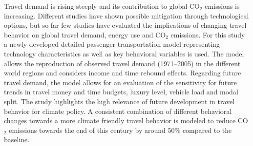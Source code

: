 Travel demand is rising steeply and its contribution to global CO$_2$ emissions is increasing. Different studies have shown possible mitigation through technological options, but so far few studies have evaluated the implications of changing travel behavior on global travel demand, energy use and CO$_2$ emissions. For this study a newly developed detailed passenger transportation model representing technology characteristics as well as key behavioral variables is used. The model allows the reproduction of observed travel demand (1971–2005) in the different world regions and considers income and time rebound effects. Regarding future travel demand, the model allows for an evaluation of the sensitivity for future trends in travel money and time budgets, luxury level, vehicle load and modal split. The study highlights the high relevance of future development in travel behavior for climate policy. A consistent combination of different behavioral changes towards a more climate friendly travel behavior is modeled to reduce CO$_2$ emissions towards the end of this century by around 50\% compared to the baseline.
